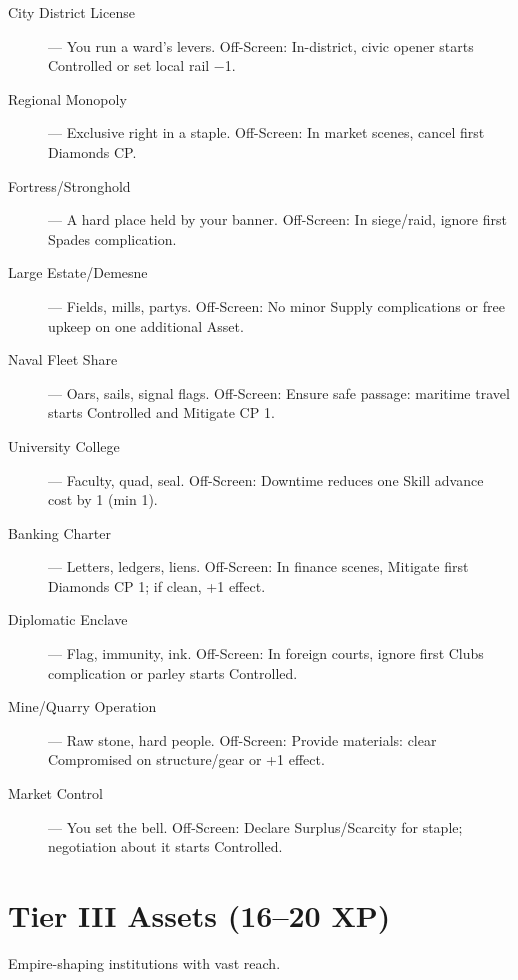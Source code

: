 \begin{description}
  \item[City District License] — You run a ward's levers. Off-Screen: In-district, civic opener starts Controlled or set local rail −1.
  \item[Regional Monopoly] — Exclusive right in a staple. Off-Screen: In market scenes, cancel first Diamonds CP.
  \item[Fortress/Stronghold] — A hard place held by your banner. Off-Screen: In siege/raid, ignore first Spades complication.
  \item[Large Estate/Demesne] — Fields, mills, partys. Off-Screen: No minor Supply complications or free upkeep on one additional Asset.
  \item[Naval Fleet Share] — Oars, sails, signal flags. Off-Screen: Ensure safe passage: maritime travel starts Controlled and Mitigate CP 1.
  \item[University College] — Faculty, quad, seal. Off-Screen: Downtime reduces one Skill advance cost by 1 (min 1).
  \item[Banking Charter] — Letters, ledgers, liens. Off-Screen: In finance scenes, Mitigate first Diamonds CP 1; if clean, +1 effect.
  \item[Diplomatic Enclave] — Flag, immunity, ink. Off-Screen: In foreign courts, ignore first Clubs complication or parley starts Controlled.
  \item[Mine/Quarry Operation] — Raw stone, hard people. Off-Screen: Provide materials: clear Compromised on structure/gear or +1 effect.
  \item[Market Control] — You set the bell. Off-Screen: Declare Surplus/Scarcity for staple; negotiation about it starts Controlled.
\end{description}

\section{Tier III Assets (16–20 XP)}

Empire-shaping institutions with vast reach.


